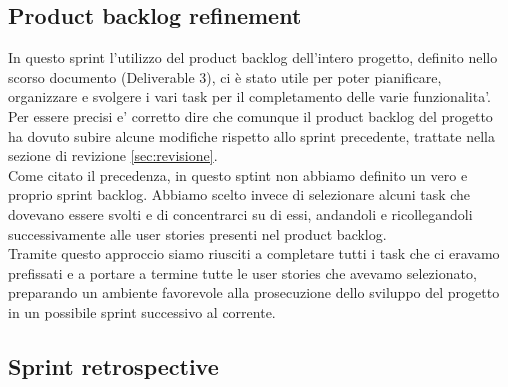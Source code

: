 \documentclass{article}
\begin{document}
\subsection{Product backlog refinement}
In questo sprint l'utilizzo del product backlog dell'intero progetto, definito nello scorso documento (Deliverable 3), ci è stato utile per poter pianificare, organizzare e svolgere i vari task per il completamento delle varie funzionalita'.\\
Per essere precisi e' corretto dire che comunque il product backlog del progetto ha dovuto subire alcune modifiche rispetto allo sprint precedente, trattate nella sezione di revizione \ref{sec:revisione}.\\

Come citato il precedenza, in questo sptint non abbiamo definito un vero e proprio sprint backlog. Abbiamo scelto invece di selezionare alcuni task che dovevano essere svolti e di concentrarci su di essi, andandoli e ricollegandoli successivamente alle user stories presenti nel product backlog.\\
Tramite questo approccio siamo riusciti a completare tutti i task che ci eravamo prefissati e a portare a termine tutte le user stories che avevamo selezionato, preparando un ambiente favorevole alla prosecuzione dello sviluppo del progetto in un possibile sprint successivo al corrente.\\

\clearpage

\subsection{Sprint retrospective}
\end{document}

